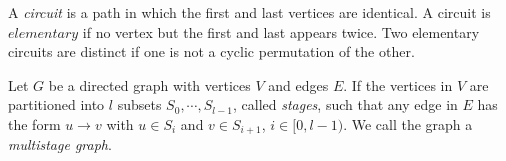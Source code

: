 A \textit{circuit} is a path in which the first and last vertices are identical. A circuit is $elementary$ if no vertex but the first and last appears twice. Two elementary circuits are distinct if one is not a cyclic permutation of the other. 


Let $G$ be a directed graph with vertices $V$ and edges $E$. If the vertices in $V$ are partitioned into $l$ subsets $S_0,\cdots,S_{l-1}$, called \textit{stages}, such that any edge in $E$ has the form $u\rightarrow v$ with $u\in S_i$ and $v\in S_{i+1}$, $i\in[0,l-1)$. We call the graph a \textit{multistage graph}.

